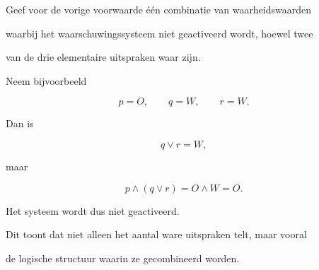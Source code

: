 \documentclass{ximera}
\begin{document}
\begin{oefening}{\oefG}
\begin{question}

Geef voor de vorige voorwaarde één combinatie van waarheidswaarden

waarbij het waarschuwingssysteem niet geactiveerd wordt, hoewel twee

van de drie elementaire uitspraken waar zijn.

\begin{oplossing}

Neem bijvoorbeeld

\[
p=O,\qquad q=W,\qquad r=W.
\]

Dan is

\[
q\lor r=W,
\]

maar

\[
p\land(q\lor r)
=
O\land W
=
O.
\]

Het systeem wordt dus niet geactiveerd.

Dit toont dat niet alleen het aantal ware uitspraken telt, maar vooral

de logische structuur waarin ze gecombineerd worden.

\end{oplossing}

\end{question}

\end{oefening}
\end{document}
